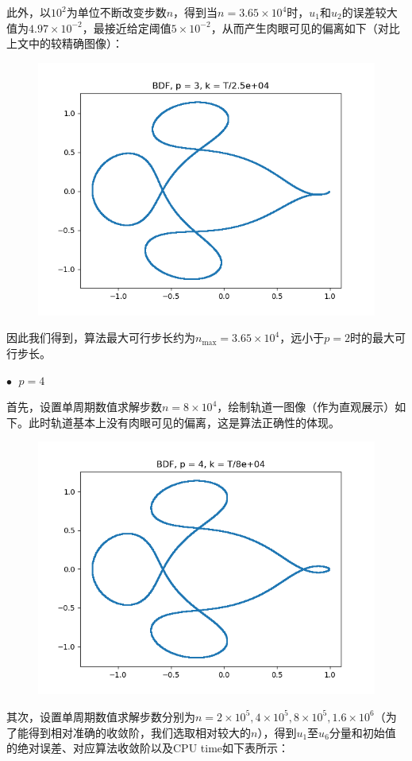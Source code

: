 \documentclass{ctexart}
\begin{document}
\begin{sloppypar}
此外，以$10^2$为单位不断改变步数$n$，得到当$n = 3.65 \times 10^4$时，$u_1$和$u_2$的误差较大值为$4.97 \times 10^{-2}$，最接近给定阈值$5 \times 10^{-2}$，从而产生肉眼可见的偏离如下（对比上文中的较精确图像）：
\begin{figure}[H]
\centering
\includegraphics[scale = 0.45]{./report_src/Figure_22.png}
\end{figure}
因此我们得到，算法最大可行步长约为$n_{\max} = 3.65 \times 10^4$，远小于$p=2$时的最大可行步长。

$\bullet \;$ $p = 4$

首先，设置单周期数值求解步数$n = 8 \times 10^4$，绘制轨道一图像（作为直观展示）如下。此时轨道基本上没有肉眼可见的偏离，这是算法正确性的体现。
\begin{figure}[H]
\centering
\includegraphics[scale = 0.45]{./report_src/Figure_23.png}
\end{figure}
其次，设置单周期数值求解步数分别为$n = 2 \times 10^5,4 \times 10^5,8 \times 10^5, 1.6 \times 10^6$（为了能得到相对准确的收敛阶，我们选取相对较大的$n$），得到$u_1$至$u_6$分量和初始值的绝对误差、对应算法收敛阶以及CPU time如下表所示：


\end{sloppypar}
\end{document}
